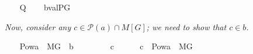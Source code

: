 \begin{isabelle}
\ \ \isamarkupfalse%
\ {\isacharquery}{\kern0pt}{\isasympi}{\isacharequal}{\kern0pt}{\isachardoublequoteopen}{\isacharquery}{\kern0pt}Q{\isasymtimes}{\isacharbraceleft}{\kern0pt}{\isasymone}{\isacharbraceright}{\kern0pt}{\isachardoublequoteclose}\isanewline
\ \ \isamarkupfalse%
\ {\isacharquery}{\kern0pt}b{\isacharequal}{\kern0pt}{\isachardoublequoteopen}val{\isacharparenleft}{\kern0pt}P{\isacharcomma}{\kern0pt}G{\isacharcomma}{\kern0pt}{\isacharquery}{\kern0pt}{\isasympi}{\isacharparenright}{\kern0pt}{\isachardoublequoteclose}%
\end{isabelle}
\textit{Now,
  consider any $c \in \mathcal{P}(a) \cap M[G]$; we need to show that
  $c \in b$.}
\begin{isabelle}
  \label{goal-on-b}
\ \ \isamarkupfalse%
\ {\isachardoublequoteopen}Pow{\isacharparenleft}{\kern0pt}a{\isacharparenright}{\kern0pt}\ {\isasyminter}\ M{\isacharbrackleft}{\kern0pt}G{\isacharbrackright}{\kern0pt}\ {\isasymsubseteq}\ {\isacharquery}{\kern0pt}b{\isachardoublequoteclose}\isanewline
\ \ \isamarkupfalse%
\isanewline
\ \ \ \ \isamarkupfalse%
\ c\isanewline
\ \ \ \ \isamarkupfalse%
\ {\isachardoublequoteopen}c\ {\isasymin}\ Pow{\isacharparenleft}{\kern0pt}a{\isacharparenright}{\kern0pt}\ {\isasyminter}\ M{\isacharbrackleft}{\kern0pt}G{\isacharbrackright}{\kern0pt}{\isachardoublequoteclose}
\end{isabelle}

